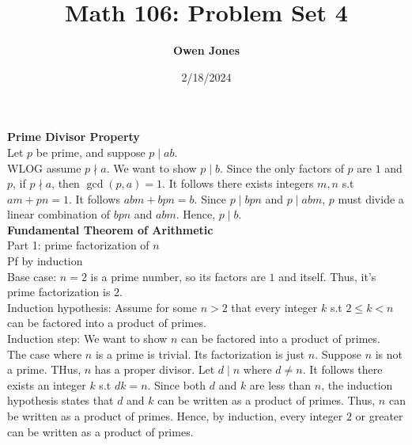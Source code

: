 \documentclass[10pt]{article}
\title{\bf Math 106: Problem Set 4}
\date{2/18/2024}
\author{\bf Owen Jones}
\begin{document}
\maketitle
\textbf{Prime Divisor Property}\\
Let $p$ be prime, and suppose $p\mid ab$.\\
WLOG assume $p\nmid a$. We want to show $p\mid b$.
Since the only factors of $p$ are $1$ and $p$, if $p\nmid a$, then $\gcd(p,a)=1$.
It follows there exists integers $m,n$ s.t $am+pn=1$. It follows $abm+bpn=b$.
Since $p\mid bpn$ and $p\mid abm$, $p$ must divide a linear combination of $bpn$ and $abm$.
Hence, $p\mid b$.\\  
\textbf{Fundamental Theorem of Arithmetic}\\
Part 1: prime factorization of $n$\\
Pf by induction\\
Base case: $n=2$ is a prime number, so its factors are $1$ and itself. Thus, it's prime factorization is $2$.\\
Induction hypothesis: Assume for some $n>2$ that every integer $k$ s.t $2\le k<n$ can be factored into a product of primes.\\
Induction step: We want to show $n$ can be factored into a product of primes.\\
The case where $n$ is a prime is trivial. Its factorization is just $n$.
Suppose $n$ is not a prime. THus, $n$ has a proper divisor. Let $d\mid n$ where $d\neq n$.
It follows there exists an integer $k$ s.t $dk=n$. 
Since both $d$ and $k$ are less than $n$, the induction hypothesis states that $d$ and $k$ can be written as a product of primes. 
Thus, $n$ can be written as a product of primes.
Hence, by induction, every integer $2$ or greater can be written as a product of primes.\\
\end{document}
